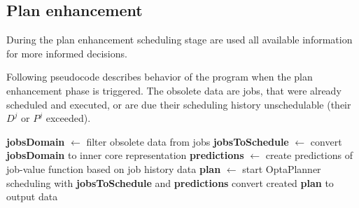 \subsection{Plan enhancement}\label{subsec:plan-enhancement}
During the plan enhancement scheduling stage are used all available information for more informed decisions.

Following pseudocode describes behavior of the program when the plan enhancement phase is triggered.
The obsolete data are jobs,
that were already scheduled and executed,
or are due their scheduling history unschedulable (their $D^{j}$ or $P^{j}$ exceeded).

\begin{algorithm}[H]
	\SetAlgoLined
    \textbf{jobsDomain} $\leftarrow$ filter obsolete data from jobs\;
    \textbf{jobsToSchedule} $\leftarrow$ convert \textbf{jobsDomain} to inner core representation\;
    \textbf{predictions} $\leftarrow$ create predictions of job-value function based on job history data\;
	\textbf{plan} $\leftarrow$ start OptaPlanner scheduling with \textbf{jobsToSchedule} and \textbf{predictions}\;
	convert created \textbf{plan} to output data\;
\end{algorithm} 
